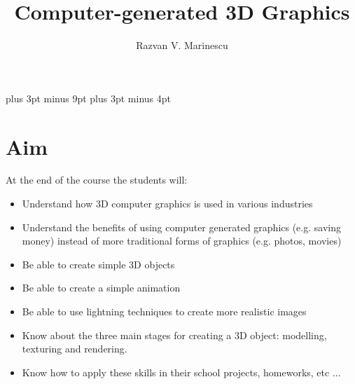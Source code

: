 \documentclass[11pt,a4paper]{article}
\begin{document}
\belowdisplayskip=12pt plus 3pt minus 9pt
\belowdisplayshortskip=7pt plus 3pt minus 4pt


% 
% 
% 
% 
% 
% 


\title{Computer-generated 3D Graphics}

\author{Razvan V. Marinescu}

\vspace{-3em}
\maketitle

\section{Aim}

At the end of the course the students will:
\begin{itemize}
 \item Understand how 3D computer graphics is used in various industries
 \item Understand the benefits of using computer generated graphics (e.g. saving money) instead of more traditional forms of graphics (e.g. photos, movies)
 \item Be able to create simple 3D objects
 \item Be able to create a simple animation
 \item Be able to use lightning techniques to create more realistic images
 \item Know about the three main stages for creating a 3D object: modelling, texturing and rendering.
 \item Know how to apply these skills in their school projects, homeworks, etc ...
\end{itemize}
\end{document}
